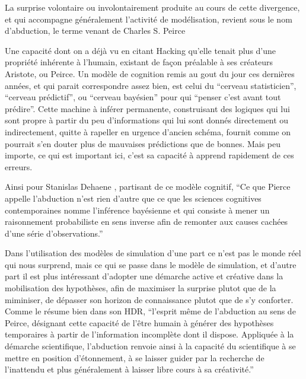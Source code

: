La surprise volontaire ou involontairement produite au cours de cette divergence, et qui accompagne généralement l'activité de modélisation, revient sous le nom d'abduction, le terme venant de Charles S. Peirce \autocites{Besse2000, Banos2013, Phan2006, Livet2014} 

Une capacité dont on a déjà vu en citant Hacking \autocites{Hacking1989,Hacking2003, Hacking2006} qu'elle tenait plus d'une propriété inhérente à l'humain, existant de façon préalable à ses créateurs Aristote, ou Peirce. Un modèle de cognition remis au gout du jour ces dernières années, et qui parait correspondre assez bien, est celui du \enquote{cerveau statisticien},  \enquote{cerveau prédictif}, ou \enquote{cerveau bayésien} pour qui \enquote{penser c'est avant tout prédire}. Cette machine à inférer permanente, construisant des logiques qui lui sont propre à partir du peu d'informations qui lui sont donnés directement ou indirectement, quitte à rapeller en urgence d'ancien schéma, fournit comme on pourrait s'en douter plus de mauvaises prédictions que de bonnes. Mais peu importe, ce qui est important ici, c'est sa capacité à apprend rapidement de ces erreurs. 

Ainsi pour Stanislas Dehaene , partisant de ce modèle cognitif, \enquote{Ce que Pierce appelle l'abduction n'est rien d'autre que ce que les sciences cognitives contemporaines nomme l'inférence bayésienne et qui consiste à mener un raisonnement probabiliste en sens inverse afin de remonter aux causes cachées d'une série d'observations.}

Dans l'utilisation des modèles de simulation d'une part ce n'est pas le monde réel qui nous surprend, mais ce qui se passe dans le modèle de simulation, et d'autre part il est plus intéressant d'adopter une démarche active et créative dans la mobilisation des hypothèses, afin de maximiser la surprise plutot que de la miminiser, de dépasser son horizon de connaissance plutot que de s'y conforter. Comme le résume bien \textcite{Banos2013} dans son HDR, \enquote{l’esprit même de l’abduction au sens de Peirce, désignant cette capacité de l’être humain à générer des hypothèses temporaires à partir de l’information incomplète dont il dispose. Appliquée à la démarche scientifique, l’abduction renvoie ainsi à la capacité du scientifique à se mettre en position d’étonnement, à se laisser guider par la recherche de l’inattendu et plus généralement à laisser libre cours à sa créativité.} 

